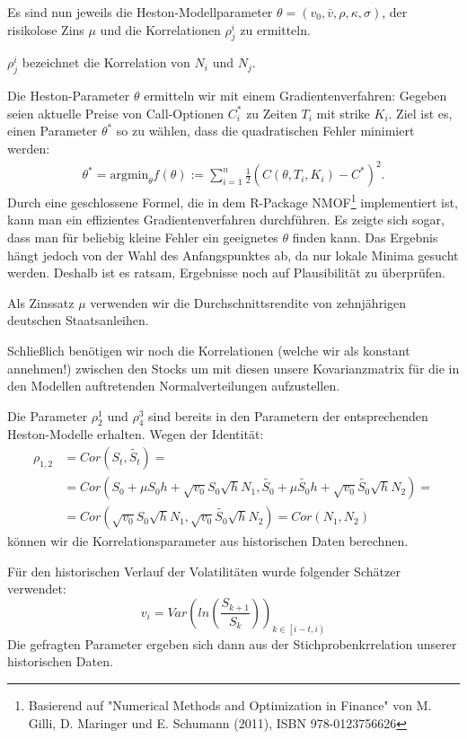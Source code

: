 \documentclass[12pt]{article}
\begin{document}
Es sind nun jeweils die Heston-Modellparameter $\theta=(v_0,\bar v, \rho, \kappa, \sigma)$, der risikolose Zins $\mu$ und die Korrelationen $\rho^i_j$ zu ermitteln.


$\rho^{i}_j$ bezeichnet die Korrelation von $N_i$ und $N_j$.





Die Heston-Parameter $\theta$ ermitteln wir mit einem Gradientenverfahren: Gegeben seien aktuelle Preise von Call-Optionen $C_i^*$ zu Zeiten $T_i$ mit strike $K_i$. Ziel ist es, einen Parameter $\theta^*$ so zu wählen, dass die quadratischen Fehler minimiert werden:
\begin{gather*}
\theta^*=\text{argmin}_{\theta} f(\theta):=\sum_{i=1}^n \frac12 (C(\theta,T_i,K_i)-C^*)^2.
\end{gather*}
Durch eine geschlossene Formel, die in dem R-Package \glqq NMOF\grqq\footnote{Basierend auf "Numerical Methods and Optimization in Finance" von M. Gilli, D. Maringer und E. Schumann (2011), ISBN 978-0123756626} implementiert ist, kann man ein effizientes Gradientenverfahren durchführen. Es zeigte sich sogar, dass man für beliebig kleine Fehler ein geeignetes $\theta$ finden kann. Das Ergebnis hängt jedoch von der Wahl des Anfangspunktes ab, da nur lokale Minima gesucht werden. Deshalb ist es ratsam, Ergebnisse noch auf Plausibilität zu überprüfen.

Als Zinssatz $\mu$ verwenden wir die Durchschnittsrendite von zehnjährigen deutschen Staatsanleihen.

Schließlich benötigen wir noch die Korrelationen (welche wir als konstant annehmen!) zwischen den Stocks um mit diesen unsere Kovarianzmatrix für die in den Modellen auftretenden Normalverteilungen aufzustellen.

Die Parameter $\rho^1_2$ und $\rho^3_4$ sind bereits in den Parametern der entsprechenden Heston-Modelle erhalten. 
Wegen der Identität:
\begin{align*}
\rho_{1,2}&=Cor(S_t,\tilde{S_t})=\\
&=Cor(S_0+\mu S_0h+\sqrt{v_0}S_0\sqrt{h}N_1,\tilde{S_0}+\mu \tilde{S_0}h+\sqrt{v_0}\tilde{S_0}\sqrt{h}N_2)= \\
&=Cor(\sqrt{v_0}S_0\sqrt{h}N_1,\sqrt{v_0}\tilde{S_0}\sqrt{h}N_2)=Cor(N_1,N_2)
\end{align*}
können wir die Korrelationsparameter aus historischen Daten berechnen.

Für den historischen Verlauf der Volatilitäten wurde folgender Schätzer verwendet:
\begin{equation*}
v_i=Var(ln(\frac{S_{k+1}}{S_k}))_{k\in\left[i-t,i\right)}
\end{equation*}
Die gefragten Parameter ergeben sich dann aus der Stichprobenkrrelation unserer historischen Daten.\\
\end{document}
